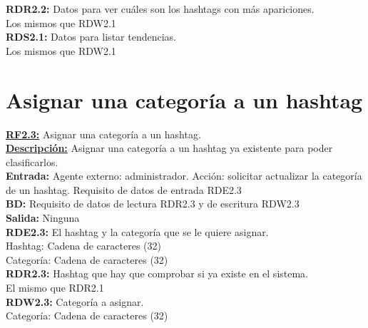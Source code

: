 \textcolor{azul}{\textbf{RDR2.2:}} Datos para ver cuáles son los hashtags con más apariciones. \\
\hspace*{1cm} Los mismos que RDW2.1\\

\textcolor{azul}{\textbf{RDS2.1:}} Datos para listar tendencias. \\
\hspace*{1cm} Los mismos que RDW2.1\\

\pagebreak

\section{Asignar una categoría a un hashtag}
\textbf{\textcolor{rojo}{\underline{RF2.3:}}} Asignar una categoría a un hashtag. \\[6pt]

\textbf{\textcolor{rojo}{\underline{Descripción:}}} Asignar una categoría a un hashtag ya existente para poder clasificarlos.\\[6pt]

\textbf{\textcolor{rojo}{Entrada:}} Agente externo: administrador. Acción: solicitar actualizar la categoría de un hashtag. 
Requisito de datos de entrada \textcolor{azul}{RDE2.3} \\[6pt]

\textbf{\textcolor{rojo}{BD:}} Requisito de datos de lectura \textcolor{azul}{RDR2.3} y de escritura \textcolor{azul}{RDW2.3}\\[6pt]

\textbf{\textcolor{rojo}{Salida:}} Ninguna\\[6pt] 

\textcolor{azul}{\textbf{RDE2.3:}} El hashtag y la categoría que se le quiere asignar. \\
\hspace*{1cm} Hashtag: Cadena de caracteres (32)\\[12pt]
\hspace*{1cm} Categoría: Cadena de caracteres (32)\\[12pt]

\textcolor{azul}{\textbf{RDR2.3:}} Hashtag que hay que comprobar si ya existe en el sistema. \\
\hspace*{1cm} El mismo que \textcolor{azul}{RDR2.1}\\

\textcolor{azul}{\textbf{RDW2.3:}} Categoría a asignar. \\
\hspace*{1cm} Categoría: Cadena de caracteres (32)\\[12pt]

